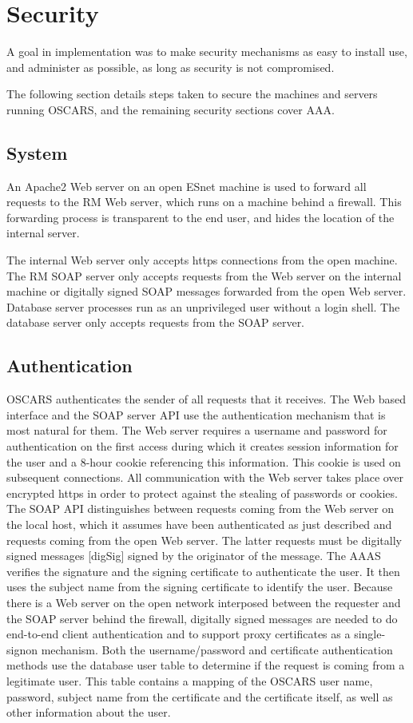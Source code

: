 \documentclass[conference]{IEEEtran}
\begin{document}
\section{Security}
A goal in implementation was to make security mechanisms as easy to install
use, and administer as possible, as long as security is not compromised.

The following section details steps taken to secure the machines and 
servers running OSCARS, and the remaining security sections cover AAA.

\subsection{System}

An Apache2 Web server on an open ESnet machine is used to forward all 
requests to the RM Web server, which runs on a machine behind a firewall. 
This forwarding process is transparent to the end user, and hides the location 
of the internal server.

The internal Web server only accepts https connections from the open machine.
The RM SOAP server only accepts requests from the Web server on the internal machine
or digitally signed SOAP messages forwarded from the open Web server.
Database server processes run as an unprivileged user without a login 
shell.  The database server only accepts requests from the SOAP server.


\subsection{Authentication}
OSCARS authenticates the sender of all requests that it receives.
The Web based interface and the SOAP server API use the
authentication mechanism that is most natural for them. The Web server
requires a username and password for authentication on the first
access during which it creates session information for the user and a
8-hour cookie referencing this information. This cookie is used on subsequent
connections. All communication with the Web server takes place over
encrypted https in order to protect against the stealing of passwords
or cookies. The SOAP API distinguishes between requests coming from
the Web server on the local host, which it assumes have been authenticated
as just described and requests coming from the open Web server. The 
latter requests  must be digitally signed messages [digSig] signed by the
originator of the message. The AAAS verifies the signature and the signing certificate to authenticate
the user. It then uses the subject name from the signing certificate
to identify the user. Because there is a Web server on the open  network interposed between the
requester and the SOAP server behind the firewall, digitally signed messages are 
needed to do end-to-end client authentication and to support proxy certificates
as a single-signon mechanism. Both the username/password and certificate 
authentication methods use the database user table to
determine if the request is coming from a legitimate user. This table
contains a mapping of the OSCARS user name, password, subject name
from the certificate and the certificate itself, as well as other
information about the user.
\end{document}
